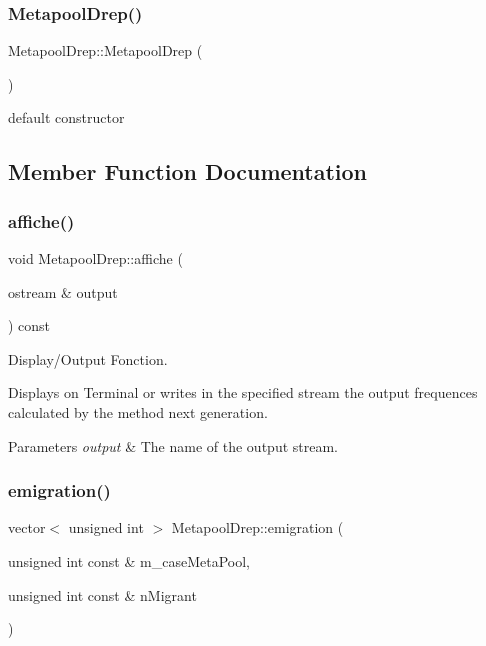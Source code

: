 \subsubsection{\texorpdfstring{Metapool\+Drep()}{MetapoolDrep()}\hspace{0.1cm}{\footnotesize\ttfamily [2/2]}}
{\footnotesize\ttfamily Metapool\+Drep\+::\+Metapool\+Drep (\begin{DoxyParamCaption}{ }\end{DoxyParamCaption})\hspace{0.3cm}{\ttfamily [default]}}



default constructor 



\subsection{Member Function Documentation}
\hypertarget{class_metapool_drep_a8df2ee194c0e2b2310e3cf318266a22c}{}\label{class_metapool_drep_a8df2ee194c0e2b2310e3cf318266a22c} 
\subsubsection{\texorpdfstring{affiche()}{affiche()}}
{\footnotesize\ttfamily void Metapool\+Drep\+::affiche (\begin{DoxyParamCaption}\item[{ostream \&}]{output }\end{DoxyParamCaption}) const}



Display/\+Output Fonction. 

Displays on Terminal or writes in the specified stream the output frequences calculated by the method next generation. 
\begin{DoxyParams}{Parameters}
{\em output} & The name of the output stream. \\
\hline
\end{DoxyParams}
\hypertarget{class_metapool_drep_a2afa16210683360aa2e7fd2211e9453a}{}\label{class_metapool_drep_a2afa16210683360aa2e7fd2211e9453a} 
\subsubsection{\texorpdfstring{emigration()}{emigration()}}
{\footnotesize\ttfamily vector$<$ unsigned int $>$ Metapool\+Drep\+::emigration (\begin{DoxyParamCaption}\item[{unsigned int const \&}]{m\+\_\+case\+Meta\+Pool,  }\item[{unsigned int const \&}]{n\+Migrant }\end{DoxyParamCaption})}



